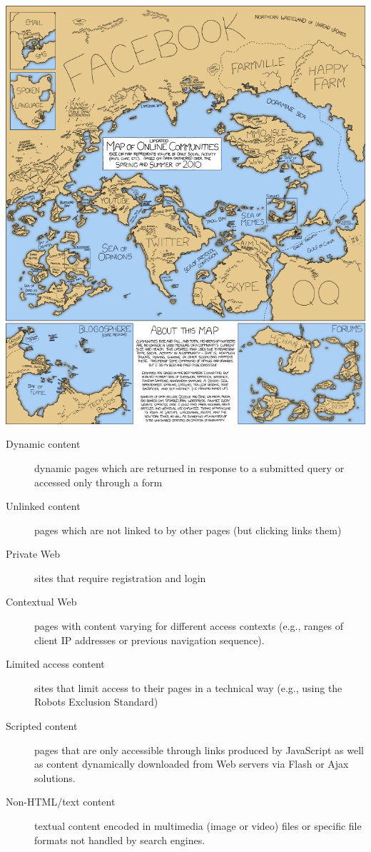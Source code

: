 \documentclass[a4paper,landscape,headrule,footrule,xetex]{foils}
\begin{document}
\begin{center}
  \includegraphics[height=\textheight]{../pics/online_communities_2}
\end{center}


\begin{description}
\item [Dynamic content] dynamic pages which are returned in response to a submitted query or accessed only through a form
\item [Unlinked content] pages which are not linked to by other pages (but clicking links them)
\item [Private Web] sites that require registration and login 
\item [Contextual Web] pages with content varying for different access contexts (e.g., ranges of client IP addresses or previous navigation sequence).
\item [Limited access content] sites that limit access to their pages
  in a technical way (e.g., using the Robots Exclusion Standard)
\item [Scripted content] pages that are only accessible through links produced by JavaScript as well as content dynamically downloaded from Web servers via Flash or Ajax solutions.
\item [Non-HTML/text content] textual content encoded in multimedia (image or video) files or specific file formats not handled by search engines.
\end{description}
\end{document}
